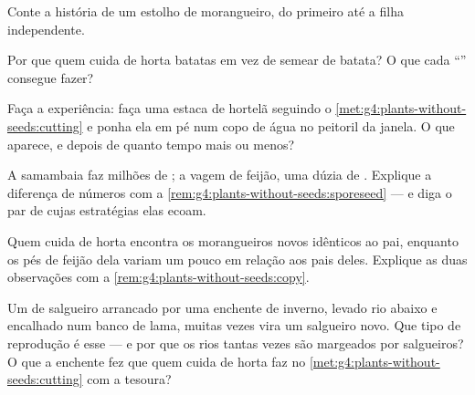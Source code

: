 \begin{exercise}[$\star$]\label{exo:g4:plants-without-seeds:6}
Conte a história de um estolho de morangueiro, do primeiro  até
a  filha independente.
\end{exercise}

\begin{exercise}[$\star$]\label{exo:g4:plants-without-seeds:7}
Por que quem cuida de horta  batatas em vez de semear 
de batata? O que cada ``'' consegue fazer?
\end{exercise}

\begin{exercise}[$\star$]\label{exo:g4:plants-without-seeds:8}
Faça a experiência: faça uma estaca de hortelã seguindo o
\cref{met:g4:plants-without-seeds:cutting} e ponha ela em pé num copo
de água no peitoril da janela. O que aparece, e depois de quanto
tempo mais ou menos?
\end{exercise}

\begin{exercise}[$\star\star$]\label{exo:g4:plants-without-seeds:9}
A samambaia faz milhões de ; a vagem de feijão, uma dúzia de
. Explique a diferença de números com a
\cref{rem:g4:plants-without-seeds:sporeseed} --- e diga o par de
 cujas estratégias elas ecoam.
\end{exercise}

\begin{exercise}[$\star\star$]\label{exo:g4:plants-without-seeds:10}
Quem cuida de horta encontra os morangueiros novos idênticos ao
pai, enquanto os pés de feijão dela variam um pouco em relação aos
pais deles. Explique as duas observações com a
\cref{rem:g4:plants-without-seeds:copy}.
\end{exercise}

\begin{exercise}[$\star\star\star$]\label{exo:g4:plants-without-seeds:11}
Um  de salgueiro arrancado por uma enchente de inverno, levado
rio abaixo e encalhado num banco de lama, muitas vezes vira um
salgueiro novo. Que tipo de reprodução é esse --- e por que os rios
tantas vezes são margeados por salgueiros? O que a enchente fez que
quem cuida de horta faz no
\cref{met:g4:plants-without-seeds:cutting} com a tesoura?
\end{exercise}
